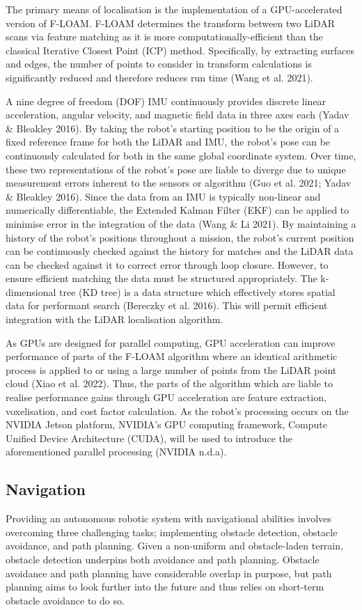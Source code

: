The primary means of localisation is the implementation of a GPU-accelerated version of F-LOAM. F-LOAM determines the transform between two LiDAR scans via feature matching as it is more computationally-efficient than the classical Iterative Closest Point (ICP) method. Specifically, by extracting surfaces and edges, the number of points to consider in transform calculations is significantly reduced and therefore reduces run time (Wang et al. 2021). 

A nine degree of freedom (DOF) IMU continuously provides discrete linear acceleration, angular velocity, and magnetic field data in three axes each (Yadav \& Bleakley 2016). By taking the robot's starting position to be the origin of a fixed reference frame for both the LiDAR and IMU, the robot's pose can be continuously calculated for both in the same global coordinate system. Over time, these two representations of the robot's pose are liable to diverge due to unique measurement errors inherent to the sensors or algorithm (Guo et al. 2021; Yadav \& Bleakley 2016). Since the data from an IMU is typically non-linear and numerically differentiable, the Extended Kalman Filter (EKF) can be applied to minimise error in the integration of the data (Wang \& Li 2021). By maintaining a history of the robot's positions throughout a mission, the robot's current position can be continuously checked against the history for matches and the LiDAR data can be checked against it to correct error through loop closure. However, to ensure efficient matching the data must be structured appropriately. The k-dimensional tree (KD tree) is a data structure which effectively stores spatial data for performant search (Bereczky et al. 2016). This will permit efficient integration with the LiDAR localisation algorithm. 

As GPUs are designed for parallel computing, GPU acceleration can improve performance of parts of the F-LOAM algorithm where an identical arithmetic process is applied to or using a large number of points from the LiDAR point cloud (Xiao et al. 2022). Thus, the parts of the algorithm which are liable to realise performance gains through GPU acceleration are feature extraction, voxelisation, and cost factor calculation. As the robot's processing occurs on the NVIDIA Jetson platform, NVIDIA's GPU computing framework, Compute Unified Device Architecture (CUDA), will be used to introduce the aforementioned parallel processing (NVIDIA n.d.a).

\subsection{Navigation}
Providing an autonomous robotic system with navigational abilities involves overcoming three challenging tasks; implementing obstacle detection, obstacle avoidance, and path planning. Given a non-uniform and obstacle-laden terrain, obstacle detection underpins both avoidance and path planning. Obstacle avoidance and path planning have considerable overlap in purpose, but path planning aims to look further into the future and thus relies on short-term obstacle avoidance to do so.

